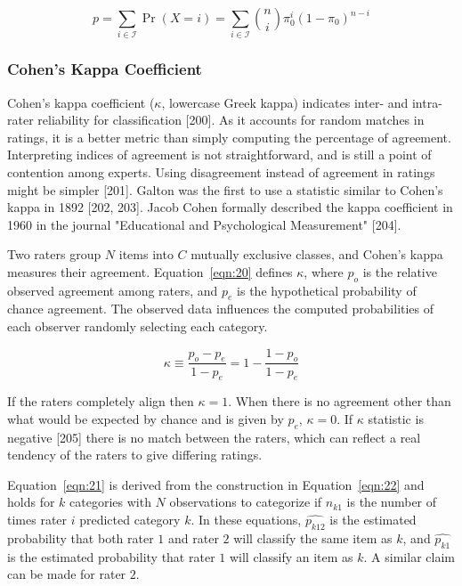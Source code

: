\documentclass[sn-mathphys-num]{sn-jnl}%
\begin{document}
\begin{equation}
	p=\sum_{i\in {\mathcal{I}}}\Pr(X=i)=\sum_{i\in {\mathcal{I}}}{\binom{n}{i}}\pi_{0}^{i}(1-\pi_{0})^{n-i}
	\label{eqn:19}
\end{equation}

\subsubsection{Cohen's Kappa Coefficient}

Cohen's kappa coefficient ($\kappa$, lowercase Greek kappa) indicates inter- and intra-rater reliability for classification [200]. As it accounts for random matches in ratings, it is a better metric than simply computing the percentage of agreement. Interpreting indices of agreement is not straightforward, and is still a point of contention among experts. Using disagreement instead of agreement in ratings might be simpler [201]. Galton was the first to use a statistic similar to Cohen's kappa in 1892 [202, 203]. Jacob Cohen formally described the kappa coefficient in 1960 in the journal "Educational and Psychological Measurement" [204].

Two raters group $N$ items into $C$ mutually exclusive classes, and Cohen's kappa measures their agreement. Equation~\ref{eqn:20} defines $\kappa$, where $p_{o}$ is the relative observed agreement among raters, and $p_{e}$ is the hypothetical probability of chance agreement. The observed data influences the computed probabilities of each observer randomly selecting each category.

\begin{equation}
	\kappa \equiv {\frac {p_{o}-p_{e}}{1-p_{e}}}=1-{\frac {1-p_{o}}{1-p_{e}}}
	\label{eqn:20}
\end{equation}

If the raters completely align then $\kappa = 1$. When there is no agreement other than what would be expected by chance and is given by $p_{e}$, $\kappa = 0$. If $\kappa$ statistic is negative [205] there is no match between the raters, which can reflect a real tendency of the raters to give differing ratings.

Equation~\ref{eqn:21} is derived from the construction in Equation~\ref{eqn:22} and holds for $k$ categories with $N$ observations to categorize if $n_{k1}$ is the number of times rater $i$ predicted category $k$. In these equations, ${\widehat{p_{k12}}}$ is the estimated probability that both rater $1$ and rater $2$ will classify the same item as $k$, and ${\widehat {p_{k1}}}$ is the estimated probability that rater $1$ will classify an item as $k$. A similar claim can be made for rater $2$.
\end{document}
